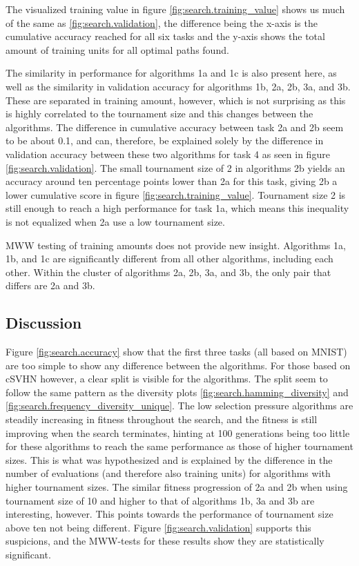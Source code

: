 The visualized training value in figure \ref{fig:search.training_value} shows us much of the same as \ref{fig:search.validation}, the difference being the x-axis is the cumulative accuracy reached for all six tasks and the y-axis shows the total amount of training units for all optimal paths found.

The similarity in performance for algorithms 1a and 1c is also present here, as well as the similarity in validation accuracy for algorithms 1b, 2a, 2b, 3a, and 3b. These are separated in training amount, however, which is not surprising as this is highly correlated to the tournament size and this changes between the algorithms. The difference in cumulative accuracy between task 2a and 2b seem to be about 0.1, and can, therefore, be explained solely by the difference in validation accuracy between these two algorithms for task 4 as seen in figure \ref{fig:search.validation}. The small tournament size of 2 in algorithms 2b yields an accuracy around ten percentage points lower than 2a for this task, giving 2b a lower cumulative score in figure \ref{fig:search.training_value}. Tournament size 2 is still enough to reach a high performance for task 1a, which means this inequality is not equalized when 2a use a low tournament size. 

MWW testing of training amounts does not provide new insight. Algorithms 1a, 1b, and 1c are significantly different from all other algorithms, including each other. Within the cluster of algorithms 2a, 2b, 3a, and 3b, the only pair that differs are 2a and 3b. 

\subsection{Discussion}
Figure \ref{fig:search.accuracy} show that the first three tasks (all based on MNIST) are too simple to show any difference between the algorithms. For those based on cSVHN however, a clear split is visible for the algorithms. The split seem to follow the same pattern as the diversity plots \ref{fig:search.hamming_diversity} and \ref{fig:search.frequency_diversity_unique}. The low selection pressure algorithms are steadily increasing in fitness throughout the search, and the fitness is still improving when the search terminates, hinting at 100 generations being too little for these algorithms to reach the same performance as those of higher tournament sizes. This is what was hypothesized and is explained by the difference in the number of evaluations (and therefore also training units) for algorithms with higher tournament sizes. The similar fitness progression of 2a and 2b when using tournament size of 10 and higher to that of algorithms 1b, 3a and 3b are interesting, however. This points towards the performance of tournament size above ten not being different. Figure \ref{fig:search.validation} supports this suspicions, and the MWW-tests for these results show they are statistically significant.

